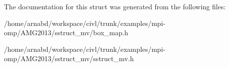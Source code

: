 The documentation for this struct was generated from the following files\+:\begin{DoxyCompactItemize}
\item 
/home/arnabd/workspace/civl/trunk/examples/mpi-\/omp/\+A\+M\+G2013/sstruct\+\_\+mv/box\+\_\+map.\+h\item 
/home/arnabd/workspace/civl/trunk/examples/mpi-\/omp/\+A\+M\+G2013/sstruct\+\_\+mv/sstruct\+\_\+mv.\+h\end{DoxyCompactItemize}
